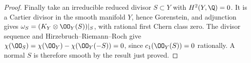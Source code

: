 \begin{proof}
Finally take an irreducible reduced divisor $S\subset Y$ with $H^2(Y,\Q)=0$. It is a Cartier divisor in the smooth manifold $Y$, hence Gorenstein, and adjunction gives $\omega_S=(K_Y\otimes\OO_Y(S))|_S$, with rational first Chern class zero. The divisor sequence and Hirzebruch--Riemann--Roch give
$\chi(\OO_S)=\chi(\OO_Y)-\chi(\OO_Y(-S))=0$, since $c_1(\OO_Y(S))=0$ rationally. A normal $S$ is therefore smooth by the result just proved.
\end{proof}


